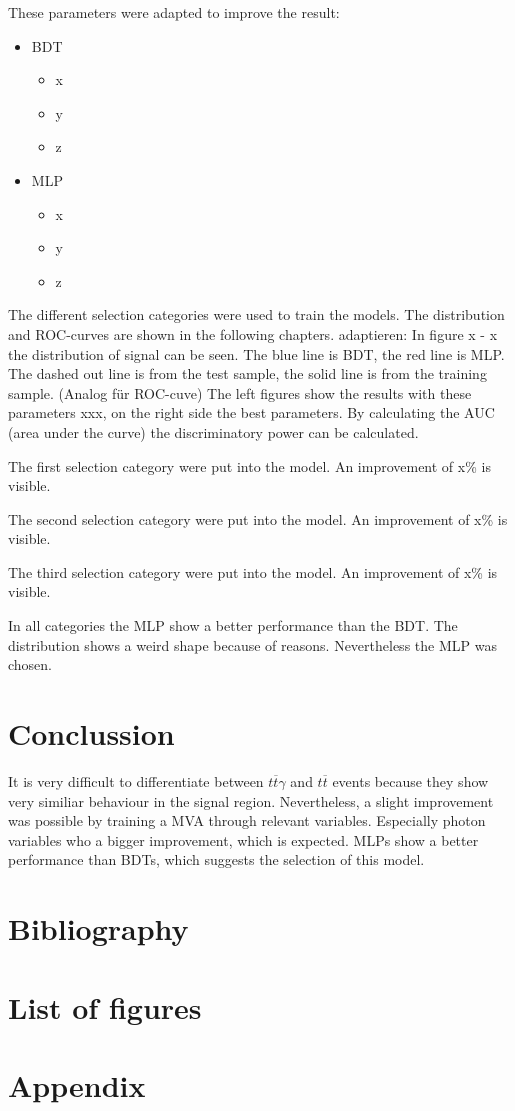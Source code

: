 \documentclass[11pt]{scrartcl}
\begin{document}
	These parameters were adapted to improve the result:
		\begin{itemize}
  			\item BDT
  					\begin{itemize}
  					\item x
  					\item y
  					\item z
  					\end{itemize}
  		  	\item MLP
  					\begin{itemize}
  					\item x
  					\item y
  					\item z
  					\end{itemize}		
		\end{itemize}
	The different selection categories were used to train the models. The distribution and ROC-curves are shown in the following chapters. adaptieren: In figure x - x the distribution of signal can be seen. The blue line is BDT, the red line is MLP. The dashed out line is from the test sample, the solid line is from the training sample. (Analog für ROC-cuve) The left figures show the results with these parameters xxx, on the right side the best parameters. By calculating the AUC (area under the curve) the discriminatory power can be calculated.
	
	The first selection category were put into the model. An improvement of x\% is visible.
	
	The second selection category were put into the model. An improvement of x\% is visible.
	
	The third selection category were put into the model. An improvement of x\% is visible.
	
	In all categories the MLP show a better performance than the BDT. The distribution shows a weird shape because of reasons. Nevertheless the MLP was chosen.
	
\section{Conclussion}
It is very difficult to differentiate between $t\overline{t}\gamma$ and $t\overline{t}$ events because they show very similiar behaviour in the signal region. Nevertheless, a slight improvement was possible by training a MVA through relevant variables. Especially photon variables who a bigger improvement, which is expected. MLPs show a better performance than BDTs, which suggests the selection of this model.

\section{Bibliography}

\section{List of figures}

\section{Appendix}
\end{document}
